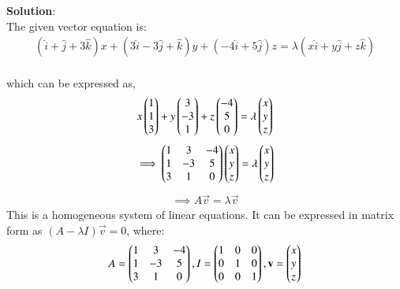 \documentclass[journal]{IEEEtran}
\begin{document}
\textbf{Solution}:\\
The given vector equation is:
\begin{align}
(\hat{i} + \hat{j} + 3\hat{k})x + (3\hat{i} - 3\hat{j} + \hat{k})y + (-4\hat{i} + 5\hat{j})z = \lambda(x\hat{i} + y\hat{j} + z\hat{k})
\end{align}\\
which can be expressed as,
\begin{align}
x\begin{pmatrix}1\\1\\3\end{pmatrix} + y\begin{pmatrix}3\\-3\\1\end{pmatrix} + z\begin{pmatrix}-4\\5\\0\end{pmatrix} = \lambda\begin{pmatrix}x\\y\\z\end{pmatrix}
\end{align}
\begin{align}
\implies\begin{myvec}{1 & 3 & -4 \\ 1 & -3 & 5 \\ 3 & 1 & 0}\end{myvec}\begin{myvec}{x \\ y \\ z}\end{myvec} = \lambda\begin{myvec}{x \\ y \\ z}\end{myvec}
\end{align}
\begin{align}
\implies A\vec{v} = \lambda\vec{v}
\end{align}
This is a homogeneous system of linear equations. It can be expressed in matrix form as $(A - \lambda I)\vec{v} = 0$, where:
\begin{align}
A = \begin{myvec}{1 & 3 & -4 \\ 1 & -3 & 5 \\ 3 & 1 & 0}\end{myvec},  I = \begin{myvec}{1 & 0 & 0 \\ 0 & 1 & 0 \\ 0 & 0 & 1}\end{myvec},  \vec{v} = \begin{myvec}{x \\ y \\ z}\end{myvec}
\end{align}
\end{document}
